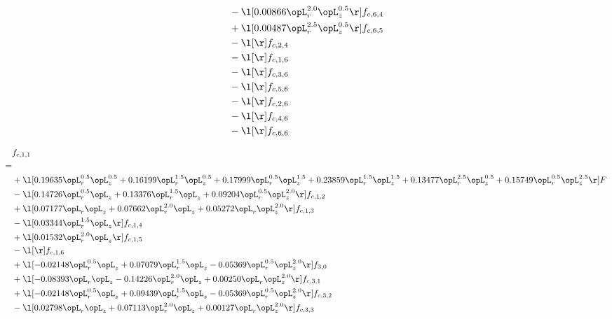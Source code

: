 \begin{alignat}{2}
& - \l[  0.00866 \opL_r^{2.0} \opL_z^{0.5}  \r] f_{c,6,4} \nonumber \\ 
& + \l[  0.00487 \opL_r^{2.5} \opL_z^{0.5}  \r] f_{c,6,5} \nonumber \\ 
& - \l[  \r] f_{c,2,4} \nonumber \\ 
& - \l[  \r] f_{c,1,6} \nonumber \\ 
& - \l[  \r] f_{c,3,6} \nonumber \\ 
& - \l[  \r] f_{c,5,6} \nonumber \\ 
& - \l[  \r] f_{c,2,6} \nonumber \\ 
& - \l[  \r] f_{c,4,6} \nonumber \\ 
& - \l[  \r] f_{c,6,6} \nonumber \\ 
\end{alignat} 


\begin{alignat}{2} 
\label{eq:f_11_2} 
& f_{c,1,1} \nonumber \\ 
 = \\ 
& + \l[  0.19635 \opL_r^{0.5} \opL_z^{0.5} +  0.16199 \opL_r^{1.5} \opL_z^{0.5} +  0.17999 \opL_r^{0.5} \opL_z^{1.5} +  0.23859 \opL_r^{1.5} \opL_z^{1.5} +  0.13477 \opL_r^{2.5} \opL_z^{0.5} +  0.15749 \opL_r^{0.5} \opL_z^{2.5}  \r] F \nonumber \\ 
& - \l[  0.14726 \opL_r^{0.5} \opL_z +  0.13376 \opL_r^{1.5} \opL_z +  0.09204 \opL_r^{0.5} \opL_z^{2.0}  \r] f_{c,1,2} \nonumber \\ 
& + \l[  0.07177 \opL_r \opL_z +  0.07662 \opL_r^{2.0} \opL_z +  0.05272 \opL_r \opL_z^{2.0}  \r] f_{c,1,3} \nonumber \\ 
& - \l[  0.03344 \opL_r^{1.5} \opL_z  \r] f_{c,1,4} \nonumber \\ 
& + \l[  0.01532 \opL_r^{2.0} \opL_z  \r] f_{c,1,5} \nonumber \\ 
& - \l[  \r] f_{c,1,6} \nonumber \\ 
& + \l[  -0.02148 \opL_r^{0.5} \opL_z +  0.07079 \opL_r^{1.5} \opL_z   -0.05369 \opL_r^{0.5} \opL_z^{2.0}  \r] f_{3,0} \nonumber \\ 
& + \l[  -0.08393 \opL_r \opL_z   -0.14226 \opL_r^{2.0} \opL_z +  0.00250 \opL_r \opL_z^{2.0}  \r] f_{c,3,1} \nonumber \\ 
& + \l[  -0.02148 \opL_r^{0.5} \opL_z +  0.09439 \opL_r^{1.5} \opL_z   -0.05369 \opL_r^{0.5} \opL_z^{2.0}  \r] f_{c,3,2} \nonumber \\ 
& - \l[  0.02798 \opL_r \opL_z +  0.07113 \opL_r^{2.0} \opL_z +  0.00127 \opL_r \opL_z^{2.0}  \r] f_{c,3,3} \nonumber \\ 

\end{alignat}
